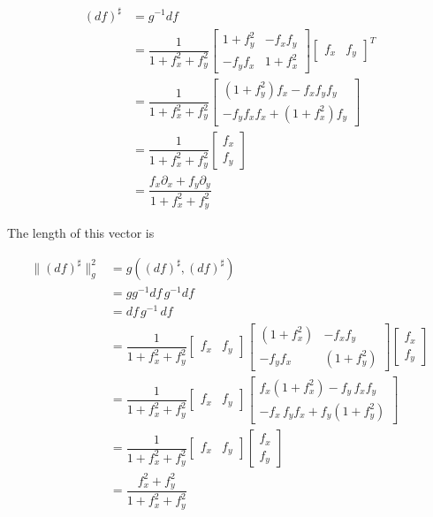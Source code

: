 \documentclass[11pt]{article}
\begin{document}
\begin{align}
    (df)^{\sharp}  
    & = g^{-1} df\\
    &= 
    \dfrac{
        1
    }{1+f_x^2+f_y^2}
    \begin{bmatrix}
        {1+f_y^2}  & -{f_x f_y}  \\
        -{f_y f_x} & {1+f_x^2}
    \end{bmatrix}
    \begin{bmatrix}
        f_x & f_y
    \end{bmatrix}^T
    \\
    &= 
    \dfrac{1}{1+f_x^2+f_y^2}
    \begin{bmatrix}
    (1+f_y^2)f_x  - {f_x f_y} f_y \\
    -{f_y f_x}f_x + (1+f_x^2)f_y
    \end{bmatrix}
    \\
    &= 
    \dfrac{1}{1+f_x^2+f_y^2}
    \begin{bmatrix}
    f_x \\ f_y
    \end{bmatrix}
    \\
    &= 
    \dfrac{f_x \partial_x + f_y \partial_y}{1+f_x^2+f_y^2}
\end{align}

The length of this vector is

\begin{align}
    \|(df)^{\sharp}\|_g^2
    & = g\left((df)^{\sharp}, (df)^{\sharp}\right) \\
    & = g g^{-1} df\, g^{-1} df \\
    & = df\, g^{-1} \,df \\
    &= 
    \dfrac{1}{1+f_x^2+f_y^2}
    \begin{bmatrix}
    f_x & f_y
    \end{bmatrix}
    \begin{bmatrix}
        (1+f_x^2) & -f_x f_y  \\
        -f_y f_x  & (1+f_y^2)
    \end{bmatrix}
    \begin{bmatrix}
    f_x \\ f_y
    \end{bmatrix} 
    \\
    &=
    \dfrac{1}{1+f_x^2+f_y^2}
    \begin{bmatrix}
    f_x & f_y
    \end{bmatrix}
    \begin{bmatrix}
    f_x(1+f_x^2) - f_y \,f_x f_y  \\ 
    -f_x \,f_y f_x + f_y (1+f_y^2)
    \end{bmatrix} 
    \\
    &=
    \dfrac{1}{1+f_x^2+f_y^2}
    \begin{bmatrix}
    f_x & f_y
    \end{bmatrix}
    \begin{bmatrix}
    f_x  \\ 
    f_y
    \end{bmatrix} 
    \\
    &=
    \dfrac{f_x^2+f_y^2}{1+f_x^2+f_y^2}
\end{align}
\end{document}
